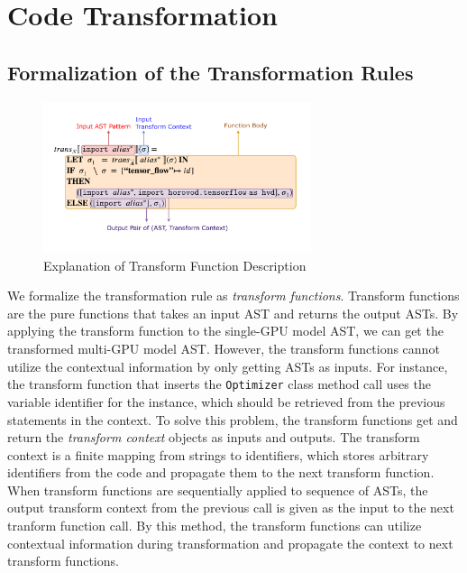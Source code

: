 \section{Code Transformation}\label{sec:trans}

\subsection{Formalization of the Transformation Rules}

\begin{figure}[ht!]
    \centering
    \includegraphics[width=0.7\textwidth]{transfn_expl.pdf}
    \caption{Explanation of Transform Function Description}
    \label{fig:trans:fnexpl}
\end{figure}

We formalize the transformation rule as \textit{transform functions}.
Transform functions are the pure functions that takes an input AST and
returns the output ASTs.
By applying the transform function to the single-GPU model AST,
we can get the transformed multi-GPU model AST.
However, the transform functions cannot utilize the contextual information
by only getting ASTs as inputs.
For instance, the transform function that inserts the {\tt Optimizer} class 
method call uses the variable identifier for the instance,
which should be retrieved from the previous statements in the context.
To solve this problem, the transform functions get and return
the \textit{transform context} objects as inputs and outputs.
The transform context is a finite mapping from strings to identifiers, which
stores arbitrary identifiers from the code and propagate them to the 
next transform function.
When transform functions are sequentially applied to sequence of ASTs, 
the output transform context from the previous call is given as the input
to the next tranform function call.
By this method, the transform functions can utilize contextual information
during transformation and propagate the context to next transform functions.

